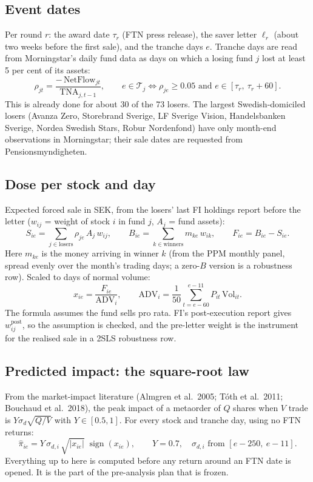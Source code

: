 \documentclass[11pt,a4paper]{article}
\newcommand{\ADV}{\mathrm{ADV}}
\begin{document}
\subsection{Event dates}
Per round $r$: the award date $\tau_r$ (FTN press release), the saver letter $\ell_r$ (about two weeks before the first sale), and the tranche days $e$. Tranche days are read from Morningstar's daily fund data as days on which a losing fund $j$ lost at least 5 per cent of its assets:
\begin{equation}
\rho_{jt} = \frac{-\,\text{NetFlow}_{jt}}{\text{TNA}_{j,t-1}}, \qquad e \in \mathcal T_j \iff \rho_{je} \ge 0.05 \text{ and } e \in [\tau_r,\ \tau_r + 60].
\end{equation}
This is already done for about 30 of the 73 losers. The largest Swedish-domiciled losers (Avanza Zero, Storebrand Sverige, LF Sverige Vision, Handelsbanken Sverige, Nordea Swedish Stars, Robur Nordenfond) have only month-end observations in Morningstar; their sale dates are requested from Pensionsmyndigheten.

\subsection{Dose per stock and day}
Expected forced sale in SEK, from the losers' last FI holdings report before the letter ($w_{ij}$ = weight of stock $i$ in fund $j$, $A_j$ = fund assets):
\begin{equation}
S_{ie} = \sum_{j\in\text{losers}} \rho_{je}\, A_j\, w_{ij}, \qquad
B_{ie} = \sum_{k\in\text{winners}} m_{ke}\, w_{ik}, \qquad
F_{ie} = B_{ie} - S_{ie}.
\end{equation}
Here $m_{ke}$ is the money arriving in winner $k$ (from the PPM monthly panel, spread evenly over the month's trading days; a zero-$B$ version is a robustness row). Scaled to days of normal volume:
\begin{equation}
x_{ie} = \frac{F_{ie}}{\ADV_i}, \qquad \ADV_i = \frac{1}{50}\sum_{t=e-60}^{e-11} P_{it}\,\text{Vol}_{it}.
\end{equation}
The formula assumes the fund sells pro rata. FI's post-execution report gives $w^{\text{post}}_{ij}$, so the assumption is checked, and the pre-letter weight is the instrument for the realised sale in a 2SLS robustness row.

\subsection{Predicted impact: the square-root law}
From the market-impact literature (Almgren et al.\ 2005; Tóth et al.\ 2011; Bouchaud et al.\ 2018), the peak impact of a metaorder of $Q$ shares when $V$ trade is $Y\sigma_d\sqrt{Q/V}$ with $Y\in[0.5,1]$. For every stock and tranche day, using no FTN returns:
\begin{equation}
\hat\pi_{ie} = Y\,\sigma_{d,i}\,\sqrt{|x_{ie}|}\;\operatorname{sign}(x_{ie}), \qquad Y = 0.7,\quad \sigma_{d,i} \text{ from } [e-250,\ e-11].
\end{equation}
Everything up to here is computed before any return around an FTN date is opened. It is the part of the pre-analysis plan that is frozen.
\end{document}
